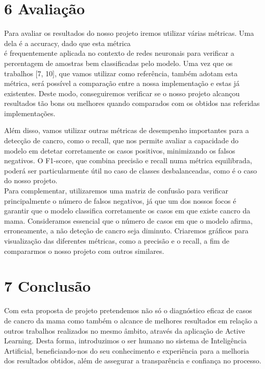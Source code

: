 \documentclass[10pt]{article}
\begin{document}
\section*{6 Avaliação}
Para avaliar os resultados do nosso projeto iremos utilizar várias métricas. Uma dela é a accuracy, dado que esta métrica\\[0pt]
é frequentemente aplicada no contexto de redes neuronais para verificar a percentagem de amostras bem classificadas pelo modelo. Uma vez que os trabalhos [7, 10], que vamos utilizar como referência, também adotam esta métrica, será possível a comparação entre a nossa implementação e estas já existentes. Deste modo, conseguiremos verificar se o nosso projeto alcançou resultados tão bons ou melhores quando comparados com os obtidos nas referidas implementações.

Além disso, vamos utilizar outras métricas de desempenho importantes para a detecção de cancro, como o recall, que nos permite avaliar a capacidade do modelo em detetar corretamente os casos positivos, minimizando os falsos negativos. O F1-score, que combina precisão e recall numa métrica equilibrada, poderá ser particularmente útil no caso de classes desbalanceadas, como é o caso do nosso projeto.\\
Para complementar, utilizaremos uma matriz de confusão para verificar principalmente o número de falsos negativos, já que um dos nossos focos é garantir que o modelo classifica corretamente os casos em que existe cancro da mama. Consideramos essencial que o número de casos em que o modelo afirma, erroneamente, a não deteção de cancro seja diminuto. Criaremos gráficos para visualização das diferentes métricas, como a precisão e o recall, a fim de compararmos o nosso projeto com outros similares.

\section*{7 Conclusão}
Com esta proposta de projeto pretendemos não só o diagnóstico eficaz de casos de cancro da mama como também o alcance de melhores resultados em relação a outros trabalhos realizados no mesmo âmbito, através da aplicação de Active Learning. Desta forma, introduzimos o ser humano no sistema de Inteligência Artificial, beneficiando-nos do seu conhecimento e experiência para a melhoria dos resultados obtidos, além de assegurar a transparência e confiança no processo.
\end{document}
